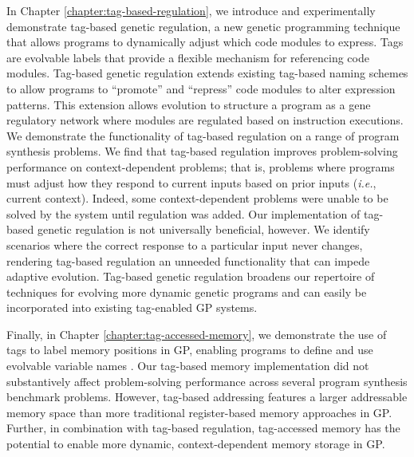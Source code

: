 In Chapter \ref{chapter:tag-based-regulation}, we introduce and experimentally demonstrate tag-based genetic regulation, a new genetic programming technique that allows programs to dynamically adjust which code modules to express.
Tags are evolvable labels that provide a flexible mechanism for referencing code modules. 
Tag-based genetic regulation extends existing tag-based naming schemes to allow programs to ``promote'' and ``repress'' code modules to alter expression patterns.
This extension allows evolution to structure a program as a gene regulatory network where modules are regulated based on instruction executions.
We demonstrate the functionality of tag-based regulation on a range of program synthesis problems. 
We find that tag-based regulation improves problem-solving performance on context-dependent problems; that is, problems where programs must adjust how they respond to current inputs based on prior inputs (\textit{i.e.}, current context).
Indeed, some context-dependent problems were unable to be solved by the system until regulation was added.
Our implementation of tag-based genetic regulation is not universally beneficial, however.
We identify scenarios where the correct response to a particular input never changes, rendering tag-based regulation an unneeded functionality that can impede adaptive evolution.
Tag-based genetic regulation broadens our repertoire of techniques for evolving more dynamic genetic programs and can easily be incorporated into existing tag-enabled GP systems.

Finally, in Chapter \ref{chapter:tag-accessed-memory}, we demonstrate the use of tags to label memory positions in GP, enabling programs to define and use evolvable variable names \citep{lalejini_tag-accessed_2019}.
Our tag-based memory implementation did not substantively affect problem-solving performance across several program synthesis benchmark problems.
However, tag-based addressing features a larger addressable memory space than more traditional register-based memory approaches in GP.
Further, in combination with tag-based regulation, tag-accessed memory has the potential to enable more dynamic, context-dependent memory storage in GP.